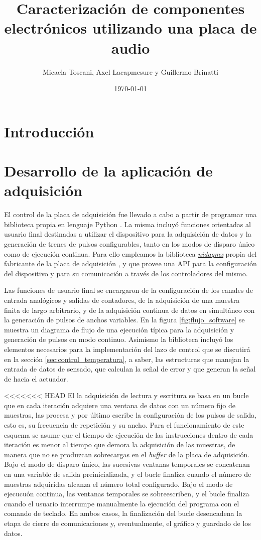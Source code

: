 \documentclass[a4paper,11pt]{article}
\title{Caracterización de componentes electrónicos utilizando una placa de audio}
\date{\today}
\author{Micaela Toscani, Axel Lacapmesure y Guillermo Brinatti}
\begin{document}
\maketitle



\section{Introducción}

\section{Desarrollo de la aplicación de adquisición}
\label{sec:software}

	El control de la placa de adquisición fue llevado a cabo a partir de programar una biblioteca propia en lenguaje Python \cite{repo}. La misma incluyó funciones orientadas al usuario final destinadas a utilizar el dispositivo para la adquisición de datos y la generación de trenes de pulsos configurables, tanto en los modos de disparo único como de ejecución continua. Para ello empleamos la biblioteca \emph{\href{https://nidaqmx-python.readthedocs.io}{nidaqmx}} propia del fabricante de la placa de adquisición \cite{nidaqmx}, y que provee una API para la configuración del dispositivo y para su comunicación a través de los controladores del mismo.
	
	Las funciones de usuario final se encargaron de la configuración de los canales de entrada analógicos y salidas de contadores, de la adquisición de una muestra finita de largo arbitrario, y de la adquisición continua de datos en simultáneo con la generación de pulsos de anchos variables. En la figura \ref{fig:flujo_software} se muestra un diagrama de flujo de una ejecución típica para la adquisición y generación de pulsos en modo continuo. Asimismo la biblioteca incluyó los elementos necesarios para la implementación del lazo de control que se discutirá en la sección \ref{sec:control_temperatura}, a saber, las estructuras que manejan la entrada de datos de sensado, que calculan la señal de error y que generan la señal de hacia el actuador.
	
<<<<<<< HEAD
	El la adquisición de lectura y escritura se basa en un bucle que en cada iteración adquiere una ventana de datos con un número fijo de muestras, las procesa y por último escribe la configuración de los pulsos de salida, esto es, su frecuencia de repetición y su ancho. Para el funcionamiento de este esquema se asume que el tiempo de ejecución de las instrucciones dentro de cada iteración es menor al tiempo que demora la adquisición de las muestras, de manera que no se produzcan sobrecargas en el \emph{buffer} de la placa de adquisición. Bajo el modo de disparo único, las sucesivas ventanas temporales se concatenan en una variable de salida preinicializada, y el bucle finaliza cuando el número de muestras adquiridas alcanza el número total configurado. Bajo el modo de ejecucuón continua, las ventanas temporales se sobreescriben, y el bucle finaliza cuando el usuario interrumpe manualmente la ejecución del programa con el comando de teclado. En ambos casos, la finalización del bucle desencadena la etapa de cierre de comunicaciones y, eventualmente, el gráfico y guardado de los datos.
	
\end{document}

